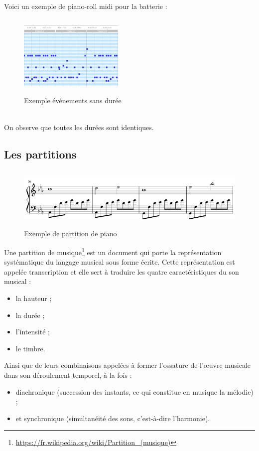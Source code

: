 Voici un exemple de piano-roll midi pour la batterie :
\begin{figure}[h!]
	\centering
	\includegraphics[height=40mm, width=50mm]{z_images/2_midi/representation_numerique_0.png}
	\caption{Exemple évènements sans durée}
\end{figure}\\
On observe que toutes les durées sont identiques.
\subsection*{Les partitions}
\begin{figure}[h!]
	\centering
	\includegraphics[height=30mm, width=120mm]{z_images/1_automatic_transcription/exemple_partoche.png}
	\caption{Exemple de partition de piano}
\end{figure}
Une partition de musique\footnote{\url{https://fr.wikipedia.org/wiki/Partition\_(musique)}} est un document qui porte la représentation systématique du langage musical sous forme écrite. Cette représentation est appelée transcription et elle sert à traduire les quatre caractéristiques du son musical :
\begin{itemize}
	\item la hauteur ;
	\item la durée ;
	\item l'intensité ;
	\item le timbre.
\end{itemize}
Ainsi que de leurs combinaisons appelées à former l'ossature de l'œuvre musicale dans son déroulement temporel, à la fois :
\begin{itemize}
	\item diachronique (succession des instants, ce qui constitue en musique la mélodie) ;
	\item et synchronique (simultanéité des sons, c'est-à-dire l'harmonie).
\end{itemize}

